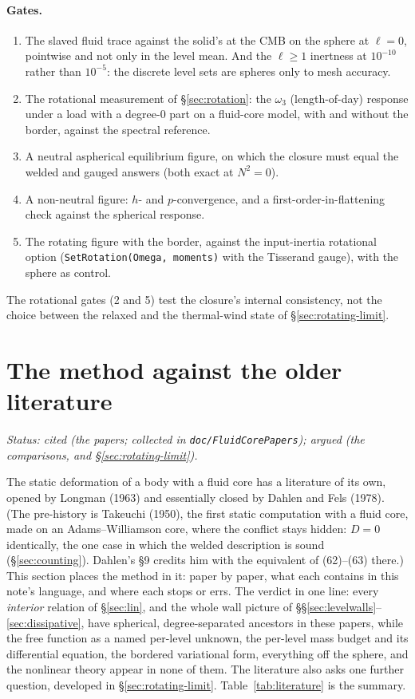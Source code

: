\documentclass[11pt]{article}
\theoremstyle{definition}
\theoremstyle{remark}
\newcommand{\code}[1]{\texttt{#1}}
\begin{document}
\paragraph{Gates.}
\begin{enumerate}
\item The slaved fluid trace against the solid's at the CMB on the
  sphere at $\ell = 0$, pointwise and not only in the level mean. And
  the $\ell \ge 1$ inertness at $10^{-10}$ rather than $10^{-5}$: the
  discrete level sets are spheres only to mesh accuracy.
\item The rotational measurement of \S\ref{sec:rotation}: the
  $\omega_3$ (length-of-day) response under a load with a degree-0
  part on a fluid-core model, with and without the border, against the
  spectral reference.
\item A neutral aspherical equilibrium figure, on which the closure
  must equal the welded and gauged answers (both exact at $N^2 = 0$).
\item A non-neutral figure: $h$- and $p$-convergence, and a
  first-order-in-flattening check against the spherical response.
\item The rotating figure with the border, against the input-inertia
  rotational option (\code{SetRotation(Omega, moments)} with the
  Tisserand gauge), with the sphere as control.
\end{enumerate}
The rotational gates (2 and 5) test the closure's internal consistency,
not the choice between the relaxed and the thermal-wind state of
\S\ref{sec:rotating-limit}.

\section{The method against the older literature}
\label{sec:literature}

\emph{Status: cited (the papers; collected in
\code{doc/FluidCorePapers}); argued (the comparisons, and
\S\ref{sec:rotating-limit}).}

The static deformation of a body with a fluid core has a literature of
its own, opened by Longman (1963) and essentially closed by Dahlen and
Fels (1978). (The pre-history is Takeuchi (1950), the first static
computation with a fluid core, made on an Adams--Williamson core,
where the conflict stays hidden: $D = 0$ identically, the one case in
which the welded description is sound (\S\ref{sec:counting}). Dahlen's
\S9 credits him with the equivalent of (62)--(63) there.) This section
places the method in it: paper by paper,
what each contains in this note's language, and where each stops or
errs. The verdict in one line: every \emph{interior} relation of
\S\ref{sec:lin}, and the whole wall picture of
\S\S\ref{sec:levelwalls}--\ref{sec:dissipative},
have spherical, degree-separated ancestors in these papers, while the
free function as a named per-level unknown, the per-level mass budget
and its differential equation, the bordered variational form,
everything off the sphere, and the nonlinear theory appear in none of
them. The literature also asks one further question,
developed in \S\ref{sec:rotating-limit}.
Table~\ref{tab:literature} is the summary.
\end{document}
